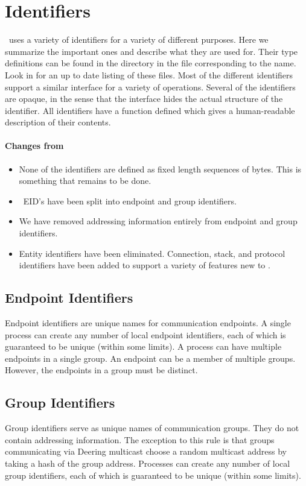 \section{Identifiers}

\ensemble\ uses a variety of identifiers for a variety of different
purposes.  Here we summarize the important ones and describe what they
are used for.  Their type definitions can be found in the
 directory in the file corresponding to the name.
Look in  for an up to date listing of these files.
Most of the different identifiers support a similar interface for a
variety of operations.  Several of the identifiers are opaque, in the
sense that the interface hides the actual structure of the identifier.
All identifiers have a  function defined which
gives a human-readable description of their contents.

\paragraph{Changes from \horus}
\begin{itemize}
\item
None of the identifiers are defined as fixed length sequences of
bytes.  This is something that remains to be done.
\item
\horus\ EID's have been split into endpoint and group identifiers.
\item
We have removed addressing information entirely from endpoint and
group identifiers.
\item
Entity identifiers have been eliminated.  Connection, stack, and
protocol identifiers have been added to support a variety of features
new to \ensemble.
\end{itemize}

\subsection{Endpoint Identifiers}
Endpoint identifiers are unique names for communication endpoints.  A
single process can create any number of local endpoint identifiers,
each of which is guaranteed to be unique (within some limits).  A
process can have multiple endpoints in a single group.  An endpoint
can be a member of multiple groups.  However, the endpoints in a group
must be distinct.

\subsection{Group Identifiers}
Group identifiers serve as unique names of communication groups.  They
do not contain addressing information.  The exception to this rule is
that groups communicating via Deering multicast choose a random
multicast address by taking a hash of the group address.  Processes
can create any number of local group identifiers, each of which is
guaranteed to be unique (within some limits).

